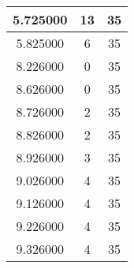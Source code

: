 \begin{longtable}[htbp]{|c|c|c|}
5.725000 & 13 & 35 \\ \hline
5.825000 & 6 & 35 \\ \hline
8.226000 & 0 & 35 \\ \hline
8.626000 & 0 & 35 \\ \hline
8.726000 & 2 & 35 \\ \hline
8.826000 & 2 & 35 \\ \hline
8.926000 & 3 & 35 \\ \hline
9.026000 & 4 & 35 \\ \hline
9.126000 & 4 & 35 \\ \hline
9.226000 & 4 & 35 \\ \hline
9.326000 & 4 & 35 \\ \hline
\end{longtable}
